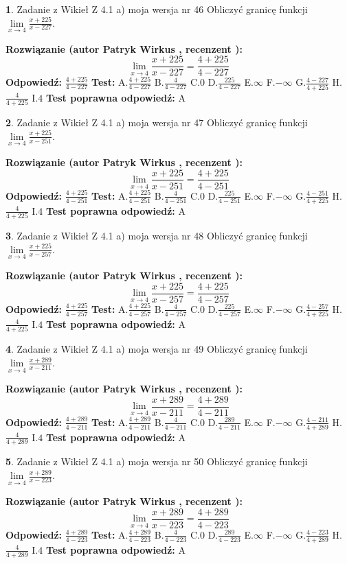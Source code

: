 \documentclass[12pt, a4paper]{article}
\theoremstyle{definition} %
\newtheorem{zad}{}
\newcommand{\zadStart}[1]{\begin{zad}#1\newline}
\newcommand{\zadStop}{\end{zad}}
\newcommand{\rozwStart}[2]{\noindent \textbf{Rozwiązanie (autor #1 , recenzent #2): }\newline}
\newcommand{\rozwStop}{\newline}
\newcommand{\odpStart}{\noindent \textbf{Odpowiedź:}\newline}
\newcommand{\odpStop}{\newline}
\newcommand{\testStart}{\noindent \textbf{Test:}\newline}
\newcommand{\testStop}{\newline}
\newcommand{\kluczStart}{\noindent \textbf{Test poprawna odpowiedź:}\newline}
\newcommand{\kluczStop}{\newline}
\begin{document}
\zadStart{Zadanie z Wikieł Z 4.1 a) moja wersja nr 46}
Obliczyć granicę funkcji $\lim\limits_{x\to4}\frac{x+225}{x-227}$.
\zadStop
\rozwStart{Patryk Wirkus}{}
$$\lim\limits_{x\to4}\frac{x+225}{x-227} = \frac{4+225}{4-227}$$
\rozwStop
\odpStart
$\frac{4+225}{4-227}$
\odpStop
\testStart
A.$\frac{4+225}{4-227}$
B.$\frac{4}{4-227}$
C.$0$
D.$\frac{225}{4-227}$
E.$\infty$
F.$-\infty$
G.$\frac{4-227}{4+225}$
H.$\frac{4}{4+225}$
I.$4$
\testStop
\kluczStart
A
\kluczStop



\zadStart{Zadanie z Wikieł Z 4.1 a) moja wersja nr 47}
Obliczyć granicę funkcji $\lim\limits_{x\to4}\frac{x+225}{x-251}$.
\zadStop
\rozwStart{Patryk Wirkus}{}
$$\lim\limits_{x\to4}\frac{x+225}{x-251} = \frac{4+225}{4-251}$$
\rozwStop
\odpStart
$\frac{4+225}{4-251}$
\odpStop
\testStart
A.$\frac{4+225}{4-251}$
B.$\frac{4}{4-251}$
C.$0$
D.$\frac{225}{4-251}$
E.$\infty$
F.$-\infty$
G.$\frac{4-251}{4+225}$
H.$\frac{4}{4+225}$
I.$4$
\testStop
\kluczStart
A
\kluczStop



\zadStart{Zadanie z Wikieł Z 4.1 a) moja wersja nr 48}
Obliczyć granicę funkcji $\lim\limits_{x\to4}\frac{x+225}{x-257}$.
\zadStop
\rozwStart{Patryk Wirkus}{}
$$\lim\limits_{x\to4}\frac{x+225}{x-257} = \frac{4+225}{4-257}$$
\rozwStop
\odpStart
$\frac{4+225}{4-257}$
\odpStop
\testStart
A.$\frac{4+225}{4-257}$
B.$\frac{4}{4-257}$
C.$0$
D.$\frac{225}{4-257}$
E.$\infty$
F.$-\infty$
G.$\frac{4-257}{4+225}$
H.$\frac{4}{4+225}$
I.$4$
\testStop
\kluczStart
A
\kluczStop



\zadStart{Zadanie z Wikieł Z 4.1 a) moja wersja nr 49}
Obliczyć granicę funkcji $\lim\limits_{x\to4}\frac{x+289}{x-211}$.
\zadStop
\rozwStart{Patryk Wirkus}{}
$$\lim\limits_{x\to4}\frac{x+289}{x-211} = \frac{4+289}{4-211}$$
\rozwStop
\odpStart
$\frac{4+289}{4-211}$
\odpStop
\testStart
A.$\frac{4+289}{4-211}$
B.$\frac{4}{4-211}$
C.$0$
D.$\frac{289}{4-211}$
E.$\infty$
F.$-\infty$
G.$\frac{4-211}{4+289}$
H.$\frac{4}{4+289}$
I.$4$
\testStop
\kluczStart
A
\kluczStop



\zadStart{Zadanie z Wikieł Z 4.1 a) moja wersja nr 50}
Obliczyć granicę funkcji $\lim\limits_{x\to4}\frac{x+289}{x-223}$.
\zadStop
\rozwStart{Patryk Wirkus}{}
$$\lim\limits_{x\to4}\frac{x+289}{x-223} = \frac{4+289}{4-223}$$
\rozwStop
\odpStart
$\frac{4+289}{4-223}$
\odpStop
\testStart
A.$\frac{4+289}{4-223}$
B.$\frac{4}{4-223}$
C.$0$
D.$\frac{289}{4-223}$
E.$\infty$
F.$-\infty$
G.$\frac{4-223}{4+289}$
H.$\frac{4}{4+289}$
I.$4$
\testStop
\kluczStart
A
\kluczStop
\end{document}
